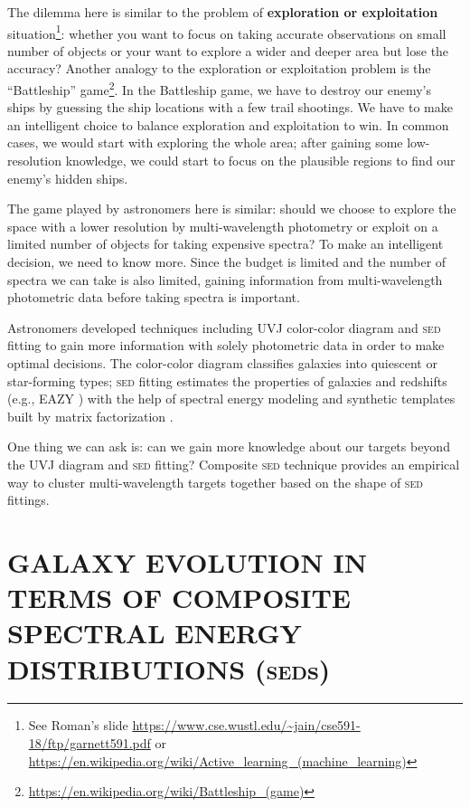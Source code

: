 \documentclass{ar-1col}
\begin{document}
The dilemma here is similar to the problem of \textbf{ exploration or exploitation } situation\footnote{See Roman's slide \citep{Garnett18} \url{https://www.cse.wustl.edu/~jain/cse591-18/ftp/garnett591.pdf} or \url{https://en.wikipedia.org/wiki/Active_learning_(machine_learning)}}:
whether you want to focus on taking accurate observations on small number of objects or your want to explore a wider and deeper area but lose the accuracy?
Another analogy to the exploration or exploitation problem is the ``Battleship'' game\footnote{\url{https://en.wikipedia.org/wiki/Battleship_(game)}}.
In the Battleship game, we have to destroy our enemy's ships by guessing the ship locations with a few trail shootings.
We have to make an intelligent choice to balance exploration and exploitation to win.
In common cases, we would start with exploring the whole area; after gaining some low-resolution knowledge, we could start to focus on the plausible regions to find our enemy's hidden ships.

The game played by astronomers here is similar: should we choose to explore the space with a lower resolution by multi-wavelength photometry or exploit on a limited number of objects for taking expensive spectra?
To make an intelligent decision, we need to know more.
Since the budget is limited and the number of spectra we can take is also limited, gaining information from multi-wavelength photometric data before taking spectra is important.

Astronomers developed techniques including UVJ color-color diagram and \textsc{sed} fitting to gain more information with solely photometric data in order to make optimal decisions.
The color-color diagram classifies galaxies into quiescent or star-forming types; \textsc{sed} fitting estimates the properties of galaxies and redshifts (e.g., EAZY \citep{Brammer2008}) with the help of spectral energy modeling and synthetic templates built by matrix factorization \citep{Blanton2007}.

One thing we can ask is: can we gain more knowledge about our targets beyond the UVJ diagram and \textsc{sed} fitting?
Composite \textsc{sed} technique \citep{Kriek2011, Forrest2018} provides an empirical way to cluster multi-wavelength targets together based on the shape of \textsc{sed} fittings.



\section{GALAXY EVOLUTION IN TERMS OF COMPOSITE SPECTRAL ENERGY DISTRIBUTIONS (\textsc{sed}s)}
\end{document}
